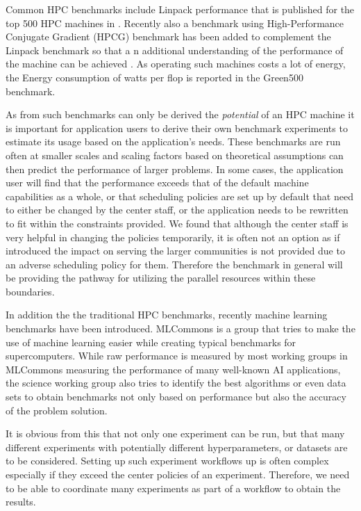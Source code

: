 \documentclass[utf8]{FrontiersinVancouver} %
\begin{document}
Common HPC benchmarks include Linpack performance that is published for the top 500 HPC machines in \citep{www-top500}. Recently also a benchmark using  High-Performance Conjugate Gradient (HPCG) benchmark has been added to complement the Linpack benchmark so that a n additional understanding of the performance of the machine can be achieved \citep{www-top500}.
As operating such machines costs a lot of energy, the Energy consumption of watts per flop is reported in the Green500 benchmark\citep{green500}.

As from such benchmarks can only be derived the {\em potential} of an HPC machine it is important for application users to derive their own benchmark experiments to estimate its usage based on the application's needs. These benchmarks are run often at smaller scales and scaling factors based on theoretical assumptions can then predict the performance of larger problems. In some cases, the application user will find that the performance exceeds that of the default machine capabilities as a whole, or that scheduling policies are set up by default that need to either be changed by the center staff, or the application needs to be rewritten to fit within the constraints provided. We found that although the center staff is very helpful in changing the policies temporarily, it is often not an option as if introduced the impact on serving the larger communities is not provided due to an adverse scheduling policy for them. Therefore the benchmark in general will be providing the pathway for utilizing the parallel resources within these boundaries.

In addition the the traditional HPC benchmarks, recently machine learning benchmarks have been introduced. MLCommons is a group that tries to make the use of machine learning easier while creating typical benchmarks for supercomputers. While raw performance is measured by most working groups in MLCommons measuring the performance of many well-known AI applications, the science working group also tries to identify the best algorithms or even data sets to obtain benchmarks not only based on performance but also the accuracy of the problem solution.

It is obvious from this that not only one experiment can be run, but that many different experiments with potentially different hyperparameters, or datasets are to be considered. Setting up such experiment workflows up is often complex especially if they exceed the center policies of an experiment. Therefore, we need to be able to coordinate many experiments as part of a workflow to obtain the results.
\end{document}
